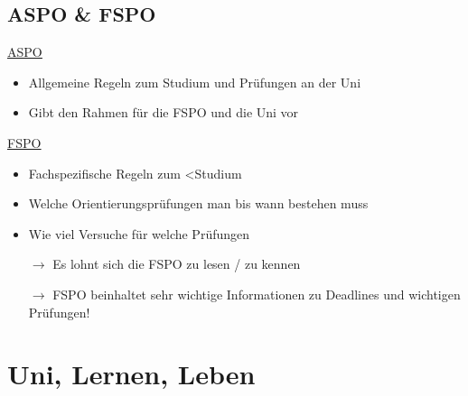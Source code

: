 \documentclass[
	aspectratio=169, 
	10pt 
]{beamer}
\begin{document}
\subsection{ASPO \& FSPO}
\begin{frame}{\insertsubsection}
    \begin{fancycolumns}[T]
        \begin{definition}{\underline{\href{https://www.uni-ulm.de/fileadmin/website_uni_ulm/zuv/zuv.dezIII.abt2u3/3-2oeffentlich/bekanntmachungen/2022/veroeffentlichung_asop_final.pdf}{ASPO}}}
            \begin{itemize}
                \item Allgemeine Regeln zum Studium und Prüfungen an der Uni
                \item Gibt den Rahmen für die FSPO und die Uni vor
            \end{itemize}
        \end{definition}

        \nextcolumn
        \begin{definition}{\underline{\href{https://www.uni-ulm.de/fileadmin/website_uni_ulm/zuv/zuv.dezIII.abt2u3/3-2oeffentlich/bekanntmachungen/2022/FSPO_Informatikstudiengaenge.pdf}{FSPO}}}
            \begin{itemize}
                \item Fachspezifische Regeln zum <Studium
                \item Welche Orientierungsprüfungen man bis wann bestehen muss
                \item Wie viel Versuche für welche Prüfungen 
            \end{itemize}
        \end{definition}
    \end{fancycolumns}
    
    \begin{itemize}
        \item[$\longrightarrow$] Es lohnt sich die FSPO zu lesen / zu kennen
        \item[$\longrightarrow$] FSPO beinhaltet sehr wichtige Informationen zu Deadlines und wichtigen Prüfungen! \newline
    \end{itemize}
\end{frame}


\section{Uni, Lernen, Leben}
\end{document}
